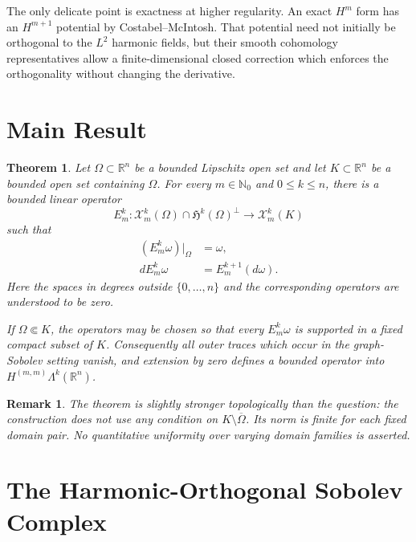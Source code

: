 \documentclass[11pt]{article}
\newtheorem{theorem}{Theorem}
\newtheorem{remark}{Remark}
\newcommand{\R}{\mathbb R}
\newcommand{\HH}{\mathfrak H}
\newcommand{\cX}{\mathcal X}
\begin{document}
The only delicate point is exactness at higher regularity.  An exact $H^m$
form has an $H^{m+1}$ potential by Costabel--McIntosh.  That potential need
not initially be orthogonal to the $L^2$ harmonic fields, but their smooth
cohomology representatives allow a finite-dimensional closed correction
which enforces the orthogonality without changing the derivative.

\section*{Main Result}

\begin{theorem}\label{thm:main}
Let $\Omega\subset\R^n$ be a bounded Lipschitz open set and let
$K\subset\R^n$ be a bounded open set containing $\Omega$.  For every
$m\in\mathbb N_0$ and $0\leq k\leq n$, there is a bounded linear operator
\[
 E_m^k:\cX_m^k(\Omega)\cap\HH^k(\Omega)^\perp
       \longrightarrow \cX_m^k(K)
\]
such that
\begin{align*}
 (E_m^k\omega)|_\Omega&=\omega,\\
 dE_m^k\omega&=E_m^{k+1}(d\omega).
\end{align*}
Here the spaces in degrees outside $\{0,\dots,n\}$ and the corresponding
operators are understood to be zero.

If $\Omega\Subset K$, the operators may be chosen so that every
$E_m^k\omega$ is supported in a fixed compact subset of $K$.  Consequently
all outer traces which occur in the graph-Sobolev setting vanish, and
extension by zero defines a bounded operator into
$H^{(m,m)}\Lambda^k(\R^n)$.
\end{theorem}

\begin{remark}
The theorem is slightly stronger topologically than the question: the
construction does not use any condition on $K\setminus\overline\Omega$.
Its norm is finite for each fixed domain pair.  No quantitative uniformity
over varying domain families is asserted.
\end{remark}

\section*{The Harmonic-Orthogonal Sobolev Complex}
\end{document}
